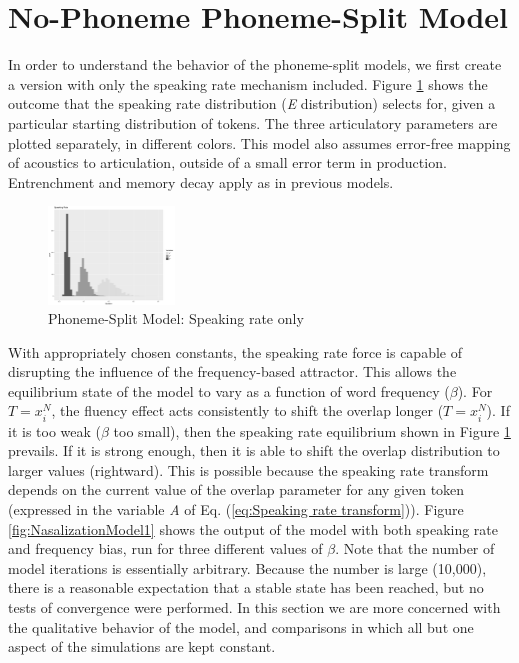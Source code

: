 \section{\label{sec:No-Phoneme-Phoneme-Split-Model}No-Phoneme Phoneme-Split
Model}

In order to understand the behavior of the phoneme-split models, we
first create a version with only the speaking rate mechanism included.
Figure \ref{fig:SpeakingRateOnly} shows the outcome that the speaking
rate distribution (\emph{E} distribution) selects for, given a particular
starting distribution of tokens. The three articulatory parameters
are plotted separately, in different colors. This model also assumes
error-free mapping of acoustics to articulation, outside of a small
error term in production. Entrenchment and memory decay apply as in
previous models.

\begin{figure}[H]

\begin{centering}
\includegraphics[width=0.3\textwidth]{figures/SpeakingRateI10000.pdf}\caption{\label{fig:SpeakingRateOnly}Phoneme-Split Model: Speaking rate only}
\par\end{centering}
\end{figure}

With appropriately chosen constants, the speaking rate force is capable
of disrupting the influence of the frequency-based attractor. This
allows the equilibrium state of the model to vary as a function of
word frequency ($\beta$). For $T=x_{i}^{N}$, the fluency effect
acts consistently to shift the overlap longer ($T=x_{i}^{N}$). If
it is too weak ($\beta$ too small), then the speaking rate equilibrium
shown in Figure \ref{fig:SpeakingRateOnly} prevails. If it is strong
enough, then it is able to shift the overlap distribution to larger
values (rightward). This is possible because the speaking rate transform
depends on the current value of the overlap parameter for any given
token (expressed in the variable \emph{A} of Eq. (\ref{eq:Speaking rate transform})).
Figure \ref{fig:NasalizationModel1} shows the output of the model
with both speaking rate and frequency bias, run for three different
values of $\beta$. Note that the number of model iterations is essentially
arbitrary. Because the number is large (10,000), there is a reasonable
expectation that a stable state has been reached, but no tests of
convergence were performed. In this section we are more concerned
with the qualitative behavior of the model, and comparisons in which
all but one aspect of the simulations are kept constant.

